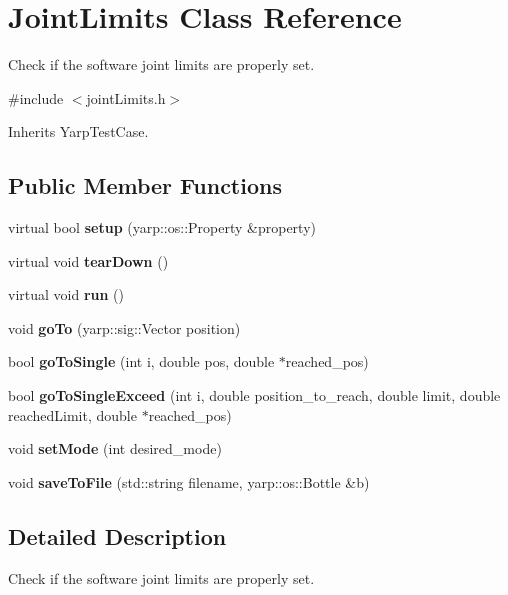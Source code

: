 \section{Joint\+Limits Class Reference}
\label{classJointLimits}


Check if the software joint limits are properly set.  




{\ttfamily \#include $<$joint\+Limits.\+h$>$}



Inherits Yarp\+Test\+Case.

\subsection*{Public Member Functions}
\begin{DoxyCompactItemize}
\item 
\label{classJointLimits_aab2cba8458562fa010452d40812d2088} 
virtual bool {\bfseries setup} (yarp\+::os\+::\+Property \&property)
\item 
\label{classJointLimits_af90bca494fc174654dbd23050438f677} 
virtual void {\bfseries tear\+Down} ()
\item 
\label{classJointLimits_a7d638220c08c9c3c500ffb6b4ecfcaa9} 
virtual void {\bfseries run} ()
\item 
\label{classJointLimits_af409fb877cde1701963fa0d5bcbb12be} 
void {\bfseries go\+To} (yarp\+::sig\+::\+Vector position)
\item 
\label{classJointLimits_a5a4a3ea41f4fb7c0e9d93fbc75a6c71c} 
bool {\bfseries go\+To\+Single} (int i, double pos, double $\ast$reached\+\_\+pos)
\item 
\label{classJointLimits_a8430fc193c56418843c67ddde4966571} 
bool {\bfseries go\+To\+Single\+Exceed} (int i, double position\+\_\+to\+\_\+reach, double limit, double reached\+Limit, double $\ast$reached\+\_\+pos)
\item 
\label{classJointLimits_ae4d5b348e7689e4c1382252bcbb0ae0a} 
void {\bfseries set\+Mode} (int desired\+\_\+mode)
\item 
\label{classJointLimits_a0790f6c7d9d1886aaa1bb4848cf790ef} 
void {\bfseries save\+To\+File} (std\+::string filename, yarp\+::os\+::\+Bottle \&b)
\end{DoxyCompactItemize}


\subsection{Detailed Description}
Check if the software joint limits are properly set. 

